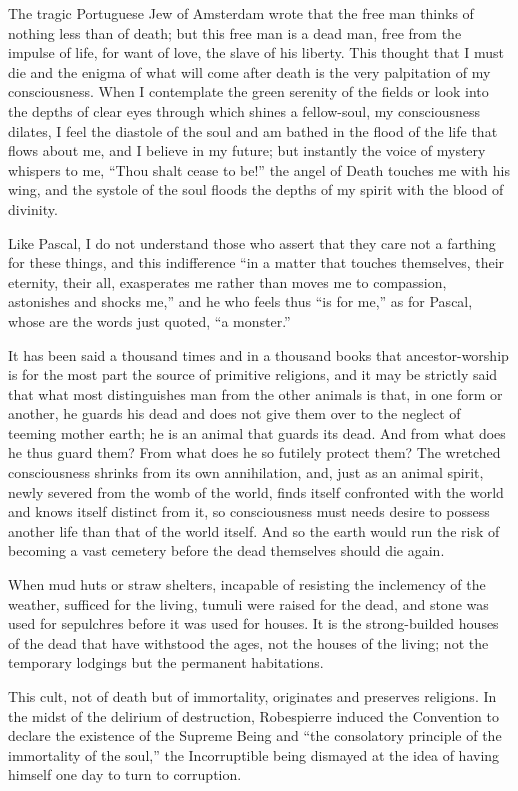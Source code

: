 The tragic Portuguese Jew of Amsterdam wrote that the free man thinks
of nothing less than of death; but this free man is a dead man, free
from the impulse of life, for want of love, the slave of his liberty.
This thought that I must die and the enigma of what will come after
death is the very palpitation of my consciousness. When I contemplate
the green serenity of the fields or look into the depths of clear eyes
through which shines a fellow-soul, my consciousness dilates, I feel
the diastole of the soul and am bathed in the flood of the life that
flows about me, and I believe in my future; but instantly the voice of
mystery whispers to me, ``Thou shalt cease to be!'' the angel of Death
touches me with his wing, and the systole of the soul floods the
depths of my spirit with the blood of divinity.

Like Pascal, I do not understand those who assert that they care not a
farthing for these things, and this indifference ``in a matter that
touches themselves, their eternity, their all, exasperates me rather
than moves me to compassion, astonishes and shocks me,'' and he who
feels thus ``is for me,'' as for Pascal, whose are the words just
quoted, ``a monster.''

It has been said a thousand times and in a thousand  books
that ancestor-worship is for the most part the source of primitive
religions, and it may be strictly said that what most distinguishes
man from the other animals is that, in one form or another, he guards
his dead and does not give them over to the neglect of teeming mother
earth; he is an animal that guards its dead. And from what does he
thus guard them? From what does he so futilely protect them? The
wretched consciousness shrinks from its own annihilation, and, just as
an animal spirit, newly severed from the womb of the world, finds
itself confronted with the world and knows itself distinct from it, so
consciousness must needs desire to possess another life than that of
the world itself. And so the earth would run the risk of becoming a
vast cemetery before the dead themselves should die again.

When mud huts or straw shelters, incapable of resisting the inclemency
of the weather, sufficed for the living, tumuli were raised for the
dead, and stone was used for sepulchres before it was used for houses.
It is the strong-builded houses of the dead that have withstood the
ages, not the houses of the living; not the temporary lodgings but the
permanent habitations.

This cult, not of death but of immortality, originates and preserves
religions. In the midst of the delirium of destruction, Robespierre
induced the Convention to declare the existence of the Supreme Being
and ``the consolatory principle of the immortality of the soul,'' the
Incorruptible being dismayed at the idea of having himself one day to
turn to corruption.

